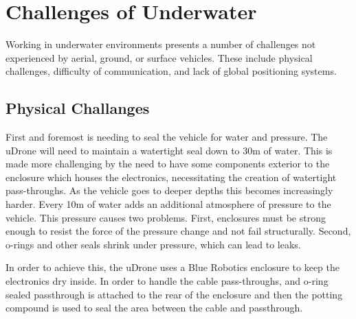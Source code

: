 
\section{Challenges of Underwater}
Working in underwater environments presents a number of challenges not experienced by aerial, ground, or surface vehicles. These include physical challenges, difficulty of communication, and lack of global positioning systems. 
\subsection{Physical Challanges}
First and foremost is needing to seal the vehicle for water and pressure. The uDrone will need to maintain a watertight seal down to 30m of water. This is made more challenging by the need to have some components exterior to the enclosure which houses the electronics, necessitating the creation of watertight pass-throughs. As the vehicle goes to deeper depths this becomes increasingly harder. Every 10m of water adds an additional atmosphere of pressure to the vehicle. This pressure causes two problems. First, enclosures must be strong enough to resist the force of the pressure change and not fail structurally. Second, o-rings and other seals shrink under pressure, which can lead to leaks. 

In order to achieve this, the uDrone uses a Blue Robotics enclosure to keep the electronics dry inside. In order to handle the cable pass-throughs, and o-ring sealed passthrough is attached to the rear of the enclosure and then the potting compound is used to seal the area between the cable and passthrough. 

